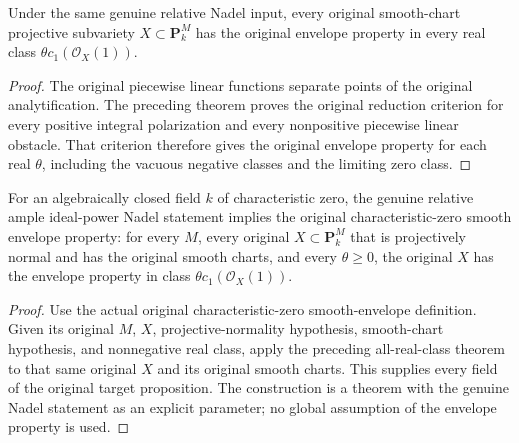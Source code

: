 \begin{theorem}
\label{thm:c0n-original-all-classes-envelope-from-nadel}
\leanok
Under the same genuine relative Nadel input, every original smooth-chart
projective subvariety $X\subset\mathbf P^M_k$ has the original envelope
property in every real class $\theta c_1(\mathcal O_X(1))$.
\end{theorem}
\begin{proof}
The original piecewise linear functions separate points of the original
analytification.  The preceding theorem proves the original reduction
criterion for every positive integral polarization and every nonpositive
piecewise linear obstacle.  That criterion therefore gives the original
envelope property for each real $\theta$, including the vacuous negative
classes and the limiting zero class.
\end{proof}

\begin{theorem}
\label{thm:c0n-original-smooth-envelope-from-nadel}
\leanok
For an algebraically closed field $k$ of characteristic zero, the genuine
relative ample ideal-power Nadel statement implies the original
characteristic-zero smooth envelope property: for every $M$, every original
$X\subset\mathbf P^M_k$ that is projectively normal and has the original
smooth charts, and every $\theta\ge0$, the original $X$ has the envelope
property in class $\theta c_1(\mathcal O_X(1))$.
\end{theorem}
\begin{proof}
Use the actual original characteristic-zero smooth-envelope definition.
Given its original $M$, $X$, projective-normality hypothesis, smooth-chart
hypothesis, and nonnegative real class, apply the preceding all-real-class
theorem to that same original $X$ and its original smooth charts.
This supplies every field of the original target proposition.
The construction is a theorem with the genuine Nadel statement as an
explicit parameter; no global assumption of the envelope property is used.
\end{proof}

